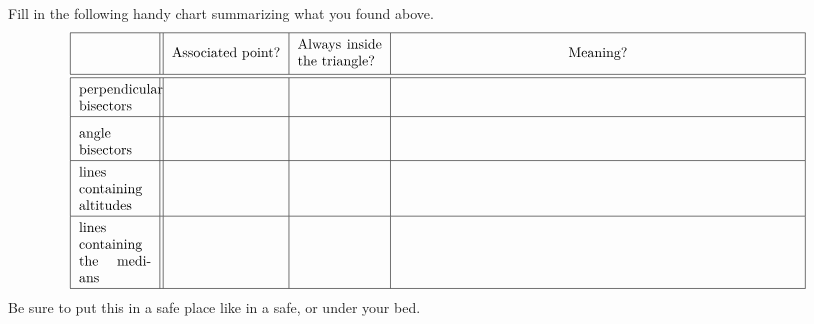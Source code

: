 \documentclass{ximera}
\begin{document}
\begin{problem}
Fill in the following handy chart summarizing what you found above. 
\[
\begin{tabular}{| l || c | c | c |}
\hline
  & Associated point? & \begin{minipage}{14ex}\minipad Always inside the triangle? \minipad\end{minipage} & Meaning? \\ \hline\hline 
\begin{minipage}{12ex}\minipad perpendicular \\ bisectors \minipad\end{minipage}  &\hspace{25mm} &\hspace{15mm}  & \hspace{100mm} \\ \hline
\begin{minipage}{12ex}\minipad angle \\ bisectors \minipad\end{minipage} & \rule[0mm]{0mm}{7mm}    &  & \\ \hline
\begin{minipage}{12ex}\minipad lines \\ containing altitudes \minipad\end{minipage} & \rule[0mm]{0mm}{7mm}    &  &  \\ \hline
\begin{minipage}{12ex}\minipad lines \\ containing the medians  \minipad\end{minipage} & \rule[0mm]{0mm}{7mm}   &  &   \\ \hline
\end{tabular}
\]
Be sure to put this in a safe place like in a safe, or under your bed.
\end{problem}
\end{document}
